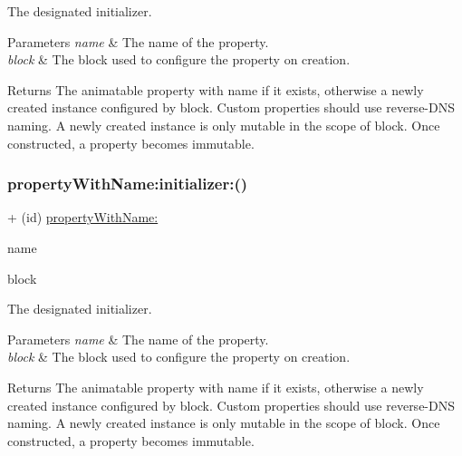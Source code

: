 The designated initializer. 
\begin{DoxyParams}{Parameters}
{\em name} & The name of the property. \\
\hline
{\em block} & The block used to configure the property on creation. \\
\hline
\end{DoxyParams}
\begin{DoxyReturn}{Returns}
The animatable property with name if it exists, otherwise a newly created instance configured by block.  Custom properties should use reverse-\/\+D\+NS naming. A newly created instance is only mutable in the scope of block. Once constructed, a property becomes immutable. 
\end{DoxyReturn}
\mbox{\label{interface_p_o_p_animatable_property_aad3690254419e0353ebfa982a22d8c6e}} 
\subsubsection{\texorpdfstring{property\+With\+Name\+:initializer\+:()}{propertyWithName:initializer:()}\hspace{0.1cm}{\footnotesize\ttfamily [3/3]}}
{\footnotesize\ttfamily + (id) \mbox{\hyperlink{interface_p_o_p_animatable_property_ad11b0dd7ba703f4ba087052ce57c12b4}{property\+With\+Name\+:}} \begin{DoxyParamCaption}\item[{(N\+S\+String $\ast$)}]{name }\item[{initializer:(void($^\wedge$)(\mbox{\hyperlink{interface_p_o_p_mutable_animatable_property}{P\+O\+P\+Mutable\+Animatable\+Property}} $\ast$prop))}]{block }\end{DoxyParamCaption}}

The designated initializer. 
\begin{DoxyParams}{Parameters}
{\em name} & The name of the property. \\
\hline
{\em block} & The block used to configure the property on creation. \\
\hline
\end{DoxyParams}
\begin{DoxyReturn}{Returns}
The animatable property with name if it exists, otherwise a newly created instance configured by block.  Custom properties should use reverse-\/\+D\+NS naming. A newly created instance is only mutable in the scope of block. Once constructed, a property becomes immutable. 
\end{DoxyReturn}
\mbox{\label{interface_p_o_p_animatable_property_a1b4363504a04cc556a6c80de5d4d7641}} 
